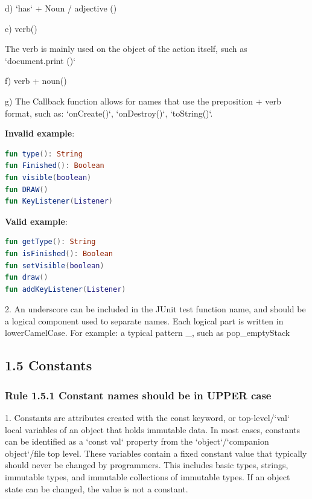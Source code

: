 d) `has` + Noun / adjective ()



e) verb()

The verb is mainly used on the object of the action itself, such as `document.print ()`



f) verb + noun() 



g) The Callback function allows for names that use the preposition + verb format, such as: `onCreate()`, `onDestroy()`, `toString()`.



\textbf{Invalid example}: 



\begin{lstlisting}[language=Kotlin]
fun type(): String
fun Finished(): Boolean
fun visible(boolean)
fun DRAW()
fun KeyListener(Listener)
\end{lstlisting}


\textbf{Valid example}: 



\begin{lstlisting}[language=Kotlin]
fun getType(): String
fun isFinished(): Boolean
fun setVisible(boolean)
fun draw()
fun addKeyListener(Listener)
\end{lstlisting}


2.	An underscore can be included in the JUnit test function name, and should be a logical component used to separate names. Each logical part is written in lowerCamelCase. For example: a typical pattern \_, such as pop\_emptyStack



\subsection*{\textbf{1.5 Constants}}

\subsubsection*{\textbf{Rule 1.5.1 Constant names should be in UPPER case}}
\leavevmode\newline



1.	Constants are attributes created with the const keyword, or top-level/`val` local variables of an object that holds immutable data. In most cases, constants can be identified as a `const val` property from the `object`/`companion object`/file top level. These variables contain a fixed constant value that typically should never be changed by programmers. This includes basic types, strings, immutable types, and immutable collections of immutable types. If an object state can be changed, the value is not a constant.



